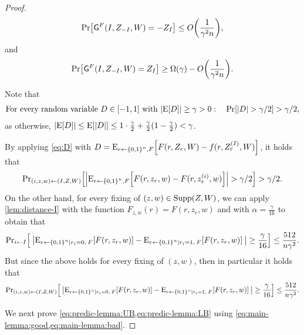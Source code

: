 \begin{proof}
	\begin{align}\label{eq:predic-lemma:UB}
		\pr{\Gc^F(I,Z_{-I}, W) = -Z_I} \leq O\paren{\frac{1}{\gamma^2 n}},
	\end{align}
	and 
	\begin{align}\label{eq:predic-lemma:LB}
		\pr{\Gc^F(I,Z_{-I}, W) = Z_I} \geq \Omega(\gamma) - O\paren{\frac{1}{\gamma^2 n}}.
	\end{align}

	Note that
	\begin{align}\label{eq:D}
		\text{For every random variable }D \in [-1,1]\text{ with }\size{\ex{D}} \geq \gamma >0: \quad \pr{\size{D} > \gamma/2} > \gamma/2,
	\end{align}
	as otherwise, $\size{\ex{D}} \leq \ex{\size{D}} \leq 1\cdot \frac{\gamma}{2} + \frac{\gamma}{2}(1-\frac{\gamma}{2}) < \gamma$.
	
	
	By applying \cref{eq:D} with $D = \eex{r \la \zo^n, F}{F(r,Z_{r},W) - f(r,Z^{(I)}_{r},W)}$, it holds that
	\begin{align}\label{eq:main-lemma:good}
		\ppr{(i,z,w) \la (I,Z,W)}{\size{\eex{r \la \zo^n, F}{F(r,z_{r},w) - F(r,z^{(i)}_{r},w)}} > \gamma/2} > \gamma/2.
	\end{align}
	On the other hand, for every fixing of $(z,w) \in \operatorname{Supp}(Z,W)$, we can apply \cref{lem:distance-I} with the function $F_{z,w}(r) = F(r,z_{r},w)$ and with $\alpha =\frac{\gamma}{16}$ to obtain that
	\begin{align*}
		\ppr{i\la I}{\: \size{\eex{r \la \zo^n \mid r_i = 0, \: F}{F(r,z_{r},w)} - \eex{r \la \zo^n \mid r_i = 1, \: F}{F(r,z_{r},w)} \:} \geq \frac{\gamma}{16}} \leq \frac{512}{n \gamma^2}.
	\end{align*}
	But since the above holds for every fixing of $(z,w)$, then in particular it holds that
	\begin{align}\label{eq:main-lemma:bad}
		\ppr{(i,z,w) \la (I,Z,W)}{\: \size{\eex{r \la \zo^n \mid r_i = 0, \: F}{F(r,z_{r},w)} - \eex{r \la \zo^n \mid r_i = 1, \: F}{F(r,z_{r},w)} \:} \geq \frac{\gamma}{16}} \leq \frac{512}{n \gamma^2}.
	\end{align}
	
	We next prove \cref{eq:predic-lemma:UB,eq:predic-lemma:LB} using \cref{eq:main-lemma:good,eq:main-lemma:bad}.
	

\end{proof}
